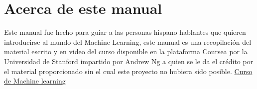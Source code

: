\documentclass{report}
\begin{document}


\renewcommand{\tablename}{Tabla}
\renewcommand{\listtablename}{Índice de tablas}
\tableofcontents
\listoffigures
\listoftables

\chapter*{Acerca de este manual}
Este manual fue hecho para guiar a las personas hispano hablantes que quieren introducirse al mundo del Machine Learning, este manual es una recopilación del material escrito y en video del curso disponible en la plataforma Coursea por la Universidad de Stanford impartido por Andrew Ng a quien se le da el crédito por el material proporcionado sin el cual este proyecto no hubiera sido posible. \href{https://www.coursera.org/learn/machine-learning/home/welcome}{Curso de Machine learning}
\end{document}
